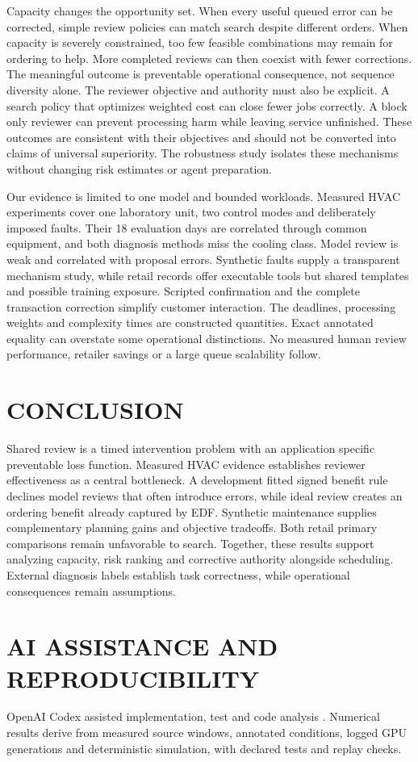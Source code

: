 Capacity changes the opportunity set. When every useful queued error can be corrected, simple review policies can match search despite different orders. When capacity is severely constrained, too few feasible combinations may remain for ordering to help. More completed reviews can then coexist with fewer corrections. The meaningful outcome is preventable operational consequence, not sequence diversity alone.
The reviewer objective and authority must also be explicit. A search policy that optimizes weighted cost can close fewer jobs correctly. A block only reviewer can prevent processing harm while leaving service unfinished. These outcomes are consistent with their objectives and should not be converted into claims of universal superiority. The robustness study isolates these mechanisms without changing risk estimates or agent preparation.

Our evidence is limited to one model and bounded workloads. Measured HVAC experiments cover one laboratory unit, two control modes and deliberately imposed faults. Their 18 evaluation days are correlated through common equipment, and both diagnosis methods miss the cooling class. Model review is weak and correlated with proposal errors. Synthetic faults supply a transparent mechanism study, while retail records offer executable tools but shared templates and possible training exposure. Scripted confirmation and the complete transaction correction simplify customer interaction. The deadlines, processing weights and complexity times are constructed quantities. Exact annotated equality can overstate some operational distinctions. No measured human review performance, retailer savings or a large queue scalability follow.



\section{CONCLUSION}
\noindent Shared review is a timed intervention problem with an application specific preventable loss function. Measured HVAC evidence establishes reviewer effectiveness as a central bottleneck. A development fitted signed benefit rule declines model reviews that often introduce errors, while ideal review creates an ordering benefit already captured by EDF. Synthetic maintenance supplies complementary planning gains and objective tradeoffs. Both retail primary comparisons remain unfavorable to search. Together, these results support analyzing capacity, risk ranking and corrective authority alongside scheduling. External diagnosis labels establish task correctness, while operational consequences remain assumptions. 

\section*{AI ASSISTANCE AND REPRODUCIBILITY}
OpenAI Codex assisted implementation, test and code analysis \cite{openai2026codex}. Numerical results derive from measured source windows, annotated conditions, logged GPU generations and deterministic simulation, with declared tests and replay checks. 


{\small}

